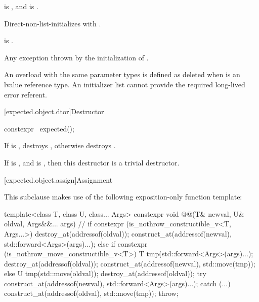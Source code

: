 \begin{itemdescr}
\pnum
\constraints
{} is , and
 is .

\pnum
\effects
Direct-non-list-initializes  with
.

\pnum
\ensures
{} is .

\pnum
\throws
Any exception thrown by the initialization of .

\pnum
\remarks
An overload with the same parameter types is defined as deleted when 
is an lvalue reference type. An initializer list cannot provide the required
long-lived error referent.
\end{itemdescr}

[expected.object.dtor]{Destructor}

%
\begin{itemdecl}
constexpr ~expected();
\end{itemdecl}

\begin{itemdescr}
\pnum
\effects
If  is , destroys ,
otherwise destroys .

\pnum
\remarks
If  is , and
 is ,
then this destructor is a trivial destructor.
\end{itemdescr}

[expected.object.assign]{Assignment}

\pnum
This subclause makes use of the following exposition-only function template:
\begin{codeblock}
template<class T, class U, class... Args>
constexpr void @@(T& newval, U& oldval, Args&&... args) {  // \expos
  if constexpr (is_nothrow_constructible_v<T, Args...>) {
    destroy_at(addressof(oldval));
    construct_at(addressof(newval), std::forward<Args>(args)...);
  } else if constexpr (is_nothrow_move_constructible_v<T>) {
    T tmp(std::forward<Args>(args)...);
    destroy_at(addressof(oldval));
    construct_at(addressof(newval), std::move(tmp));
  } else {
    U tmp(std::move(oldval));
    destroy_at(addressof(oldval));
    try {
      construct_at(addressof(newval), std::forward<Args>(args)...);
    } catch (...) {
      construct_at(addressof(oldval), std::move(tmp));
      throw;
    }
  }
}
\end{codeblock}


